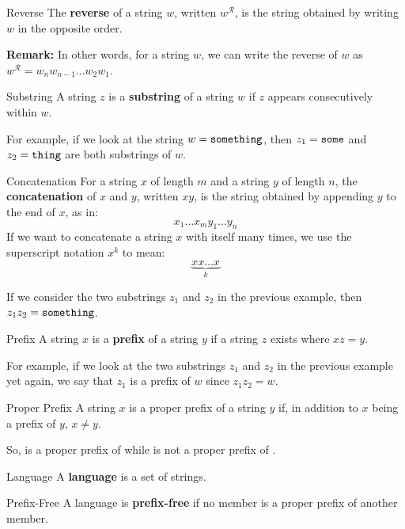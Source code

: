 \documentclass[letterpaper]{article}
\begin{document}
\begin{definition}{Reverse}{}
    The \textbf{reverse} of a string $w$, written $w^{\mathcal{R}}$, is the string obtained by writing $w$ in the opposite order.
\end{definition}
\textbf{Remark:} In other words, for a string $w$, we can write the reverse of $w$ as $w^{\mathcal{R}} = w_n w_{n - 1} \dots w_{2} w_{1}$. 

\begin{definition}{Substring}{}
    A string $z$ is a \textbf{substring} of a string $w$ if $z$ appears consecutively within $w$.
\end{definition}
For example, if we look at the string $w = \texttt{something}$, then $z_1 = \texttt{some}$ and $z_2 = \texttt{thing}$ are both substrings of $w$. 

\begin{definition}{Concatenation}{}
    For a string $x$ of length $m$ and a string $y$ of length $n$, the \textbf{concatenation} of $x$ and $y$, written $xy$, is the string obtained by appending $y$ to the end of $x$, as in: 
    \[x_1 \dots x_m y_1 \dots y_n\]
    If we want to concatenate a string $x$ with itself many times, we use the superscript notation $x^k$ to mean: 
    \[\underbrace{xx \dots x}_{k}\]
\end{definition}
If we consider the two substrings $z_1$ and $z_2$ in the previous example, then $z_1 z_2 = \texttt{something}$. 

\begin{definition}{Prefix}{}
    A string $x$ is a \textbf{prefix} of a string $y$ if a string $z$ exists where $xz = y$.
\end{definition}
For example, if we look at the two substrings $z_1$ and $z_2$ in the previous example yet again, we say that $z_1$ is a prefix of $w$ since $z_1 z_2 = w$. 

\begin{definition}{Proper Prefix}{}
    A string $x$ is a proper prefix of a string $y$ if, in addition to $x$ being a prefix of $y$, $x \neq y$.
\end{definition}
So,  is a proper prefix of  while  is not a proper prefix of .

\begin{definition}{Language}{}
    A \textbf{language} is a set of strings. 
\end{definition}

\begin{definition}{Prefix-Free}{}
    A language is \textbf{prefix-free} if no member is a proper prefix of another member.
\end{definition}
\end{document}
